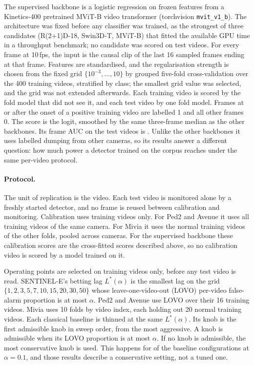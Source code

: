 The supervised backbone is a logistic regression on frozen features from a
Kinetics-400 pretrained MViT-B video transformer (torchvision \texttt{mvit\_v1\_b}). The architecture was fixed before any classifier was trained, as the strongest of three candidates (R(2+1)D-18, Swin3D-T, MViT-B) that fitted the available GPU time in a throughput benchmark; no candidate was scored on test videos.
For every frame at 10\,fps, the input is the causal clip of the last 16 sampled
frames ending at that frame. Features are standardised, and the regularisation
strength is chosen from the fixed grid $\{10^{-3},\dots,10\}$ by grouped five-fold cross-validation over the
400 training videos, stratified by class; the smallest grid value was selected, and the grid was not extended afterwards. Each training video is scored by the fold
model that did not see it, and each test video by one fold model. Frames at or
after the onset of a positive training video are labelled 1 and all other frames 0.
The score is the logit, smoothed by the same three-frame median as the other
backbones. Its frame AUC on the test videos is \RThreeMiviaSupAuc{}. Unlike the
other backbones it uses labelled dumping from other cameras, so its results answer
a different question: how much power a detector trained on the corpus reaches
under the same per-video protocol.

\paragraph{Protocol.} The unit of replication is the video. Each test video is
monitored alone by a freshly started detector, and no frame is reused between
calibration and monitoring. Calibration uses training videos only. For Ped2
and Avenue it uses all training videos of the same camera. For Mivia it uses
the normal training videos of the other folds, pooled across cameras. For the
supervised backbone these calibration scores are the cross-fitted scores described
above, so no calibration video is scored by a model trained on it.

Operating points are selected on training videos only, before any test video
is read. SENTINEL-E's betting lag $L^\ast(\alpha)$ is the smallest lag on the
grid $\{1,2,3,5,7,10,15,20,30,50\}$ whose leave-one-video-out (LOVO)
per-video false-alarm proportion is at most $\alpha$. Ped2 and Avenue use
LOVO over their 16 training videos. Mivia uses 10 folds by video index, each
holding out 20 normal training videos. Each classical baseline is thinned at the same
$L^\ast(\alpha)$. Its knob is the first admissible knob in sweep order, from the
most aggressive. A knob is admissible when its LOVO proportion is at most
$\alpha$. If no knob is admissible, the most conservative knob is used. This
happens for \RThreeBaselineNoKnob{} of the \RThreeBaselineConfigs{} baseline
configurations at $\alpha=0.1$, and those results describe a conservative
setting, not a tuned one.

